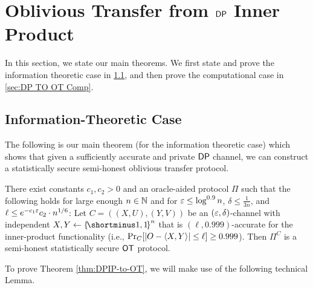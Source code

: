 \section{Oblivious Transfer from ${\sf DP}$ Inner Product}\label{sec:main_theorems}

In this section, we state our main theorems. We first state and prove the information theoretic case in \cref{sec:DP TO OT IT}, and then prove the computational case in \cref{sec:DP TO OT Comp}.

\subsection{Information-Theoretic Case}\label{sec:DP TO OT IT}
The following is our main theorem (for the information theoretic case) which shows that given a sufficiently accurate and private ${\sf DP}$ channel, we can construct a statistically secure semi-honest oblivious transfer protocol.

\begin{theorem}\label{thm:DPIP-to-OT}
There exist constants $c_1,c_2>0$ and an oracle-aided \ppt protocol $\Pi$ such that the following holds for large enough $n \in {\mathbb{N}}$ and for 
$\varepsilon \leq \log^{0.9} n$, $\delta \leq \frac1{3n}$, and $\ell \leq e^{-c_1  \varepsilon}  c_2\cdot n^{1/6}$:
    Let $C = ((X,U),(Y,V))$ be an $(\varepsilon,\delta)$-\DP channel with independent $X,Y \la \oo^n$ that is $(\ell,0.999)$-accurate for the inner-product functionality (i.e., $\ppr{C}{\size{O-\ip{X,Y}} \leq \ell} \geq 0.999$).
    Then $\Pi^C$ is a semi-honest statistically secure ${\sf OT}$ protocol.
\end{theorem}

To prove Theorem \ref{thm:DPIP-to-OT}, we will make use of the following technical Lemma.


